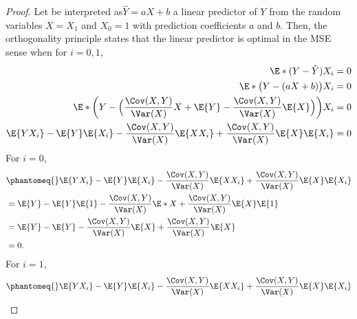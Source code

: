 \documentclass[
  coursecode={MTHE 477},
  assignmentname={Homework \homeworknumber},
  studentnumber=20053722,
  name={Bryan Hoang},
  draft,
]{
  ltxanswer%
}
\begin{document}
  \begin{questions}
    \setcounter{question}{\questionnumber}
    \addtocounter{question}{-1}
    \question[25]\
    \begin{parts}
      \part{}
      \begin{solution}
        \begin{proof}
          Let be interpreted as\(\hat{Y} = aX + b\) a linear predictor of \(Y\) from the random variables \(X = X_{1}\) and \(X_{0} = 1\) with prediction coefficients \(a\) and \(b\). Then, the orthogonality principle states that the linear predictor is optimal in the MSE sense when for \(i = 0, 1\),
          \begin{align*}
            \E*{(Y - \hat{Y}) X_{i}}                                                                                           &= 0 \\
            \E*{\bigl(Y - (aX + b)\bigr) X_{i}}                                                                                &= 0 \\
            \E*{\biggl(Y - \Bigl(\frac{\Cov(X, Y)}{\Var(X)} X + \E{Y} - \frac{\Cov(X, Y)}{\Var(X)} \E{X}\Bigr)\biggr) X_{i}}   &= 0 \\
            \E{Y X_{i}} - \E{Y} \E{X_{i}} - \frac{\Cov(X, Y)}{\Var(X)} \E{X X_{i}} + \frac{\Cov(X, Y)}{\Var(X)} \E{X}\E{X_{i}} &= 0
          \end{align*}
          For \(i = 0\),
          \begin{align*}
             &\phantomeq{} \E{Y X_{i}} - \E{Y} \E{X_{i}} - \frac{\Cov(X, Y)}{\Var(X)} \E{X X_{i}} + \frac{\Cov(X, Y)}{\Var(X)} \E{X}\E{X_{i}} \\
             &= \E{Y} - \E{Y} \E{1} - \frac{\Cov(X, Y)}{\Var(X)} \E*{X} + \frac{\Cov(X, Y)}{\Var(X)} \E{X}\E{1}                               \\
             &= \E{Y} - \E{Y} - \frac{\Cov(X, Y)}{\Var(X)} \E{X} + \frac{\Cov(X, Y)}{\Var(X)} \E{X}                                           \\
             &= 0.
          \end{align*}
          For \(i = 1\),
          \begin{align*}
             &\phantomeq{} \E{Y X_{i}} - \E{Y} \E{X_{i}} - \frac{\Cov(X, Y)}{\Var(X)} \E{X X_{i}} + \frac{\Cov(X, Y)}{\Var(X)} \E{X}\E{X_{i}} \\

\end{align*}
\end{proof}
\end{solution}
\end{parts}
\end{questions}
\end{document}
